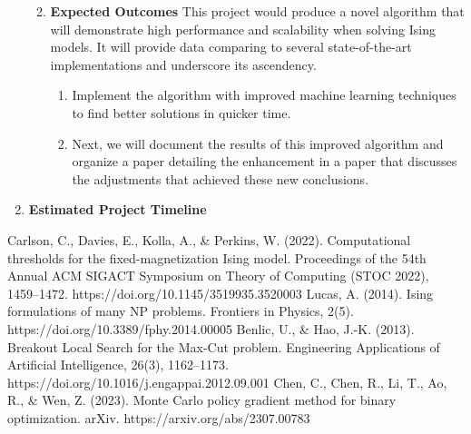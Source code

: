 \documentclass{article}
\begin{document}
\begin{enumerate}
\begin{enumerate}
\begin{enumerate}
	\end{enumerate}

	\item \textbf{Expected Outcomes}
		This project would produce a novel algorithm that will demonstrate high performance and scalability when solving Ising models. It will provide data comparing to several state-of-the-art implementations and underscore its ascendency.
	
	\begin{enumerate}
		\item Implement the algorithm with improved machine learning techniques to find better solutions in quicker time.
		\item Next, we will document the results of this improved algorithm and organize a paper detailing the enhancement in a paper that discusses the adjustments that achieved these new conclusions.
	\end{enumerate}

\end{enumerate}

\item \textbf{Estimated Project Timeline}
\end{enumerate}

\begin{thebibliography}{00}
Carlson, C., Davies, E., Kolla, A., \& Perkins, W. (2022). Computational thresholds for the fixed-magnetization Ising model. Proceedings of the 54th Annual ACM SIGACT Symposium on Theory of Computing (STOC 2022), 1459–1472. https://doi.org/10.1145/3519935.3520003
Lucas, A. (2014). Ising formulations of many NP problems. Frontiers in Physics, 2(5). https://doi.org/10.3389/fphy.2014.00005
Benlic, U., \& Hao, J.-K. (2013). Breakout Local Search for the Max-Cut problem. Engineering Applications of Artificial Intelligence, 26(3), 1162–1173. https://doi.org/10.1016/j.engappai.2012.09.001
Chen, C., Chen, R., Li, T., Ao, R., \& Wen, Z. (2023). Monte Carlo policy gradient method for binary optimization. arXiv. https://arxiv.org/abs/2307.00783


\end{thebibliography}
\end{document}

